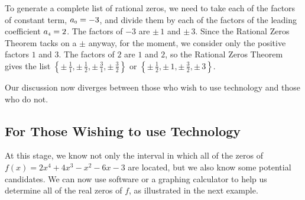 \medskip

{To generate a complete list of rational zeros, we need to take each of the factors of constant term, $a_{\mbox{\tiny$0$}} = -3$, and divide them by each of the factors of the leading coefficient $a_{\mbox{\tiny$4$}} = 2$.  The factors of $-3$ are $\pm \, 1$ and $\pm \, 3$.  Since the Rational Zeros Theorem tacks on a $\pm$ anyway, for the moment, we consider only the positive factors $1$ and $3$.  The factors of $2$ are  $1$ and $2$, so the Rational Zeros Theorem gives the list $\left\{\pm \, \frac{1}{1}, \pm \, \frac{1}{2},  \pm \, \frac{3}{1}, \pm \, \frac{3}{2}\right\}$ or $\left\{\pm \, \frac{1}{2}, \pm \, 1, \pm \, \frac{3}{2}, \pm \, 3\right\}$. }

\medskip

Our discussion now diverges between those who wish to use technology and those who do not.  


\subsection{For Those Wishing to use Technology}

At this stage, we know not only the interval in which all of the zeros of $f(x) = 2x^4+4x^3-x^2-6x-3$ are located, but we also know some potential candidates.  We can now use software or a graphing calculator to help us determine all of the real zeros of $f$, as illustrated in the next example.

